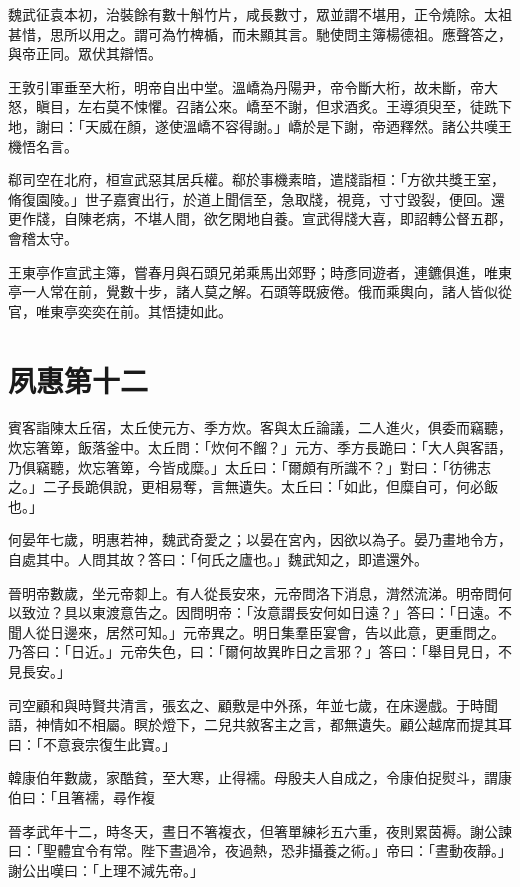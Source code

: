 魏武征袁本初，治裝餘有數十斛竹片，咸長數寸，眾並謂不堪用，正令燒除。太祖甚惜，思所以用之。謂可為竹椑楯，而未顯其言。馳使問主簿楊德祖。應聲答之，與帝正同。眾伏其辯悟。

王敦引軍垂至大桁，明帝自出中堂。溫嶠為丹陽尹，帝令斷大桁，故未斷，帝大怒，瞋目，左右莫不悚懼。召諸公來。嶠至不謝，但求酒炙。王導須臾至，徒跣下地，謝曰：「天威在顏，遂使溫嶠不容得謝。」嶠於是下謝，帝迺釋然。諸公共嘆王機悟名言。

郗司空在北府，桓宣武惡其居兵權。郗於事機素暗，遣牋詣桓：「方欲共獎王室，脩復園陵。」世子嘉賓出行，於道上聞信至，急取牋，視竟，寸寸毀裂，便回。還更作牋，自陳老病，不堪人間，欲乞閑地自養。宣武得牋大喜，即詔轉公督五郡，會稽太守。

王東亭作宣武主簿，嘗春月與石頭兄弟乘馬出郊野；時彥同遊者，連鑣俱進，唯東亭一人常在前，覺數十步，諸人莫之解。石頭等既疲倦。俄而乘輿向，諸人皆似從官，唯東亭奕奕在前。其悟捷如此。



\chapter{夙惠第十二}

賓客詣陳太丘宿，太丘使元方、季方炊。客與太丘論議，二人進火，俱委而竊聽，炊忘箸箄，飯落釜中。太丘問：「炊何不餾？」元方、季方長跪曰：「大人與客語，乃俱竊聽，炊忘箸箄，今皆成糜。」太丘曰：「爾頗有所識不？」對曰：「彷彿志之。」二子長跪俱說，更相易奪，言無遺失。太丘曰：「如此，但糜自可，何必飯也。」

何晏年七歲，明惠若神，魏武奇愛之；以晏在宮內，因欲以為子。晏乃畫地令方，自處其中。人問其故？答曰：「何氏之廬也。」魏武知之，即遣還外。

晉明帝數歲，坐元帝厀上。有人從長安來，元帝問洛下消息，潸然流涕。明帝問何以致泣？具以東渡意告之。因問明帝：「汝意謂長安何如日遠？」答曰：「日遠。不聞人從日邊來，居然可知。」元帝異之。明日集羣臣宴會，告以此意，更重問之。乃答曰：「日近。」元帝失色，曰：「爾何故異昨日之言邪？」答曰：「舉目見日，不見長安。」

司空顧和與時賢共清言，張玄之、顧敷是中外孫，年並七歲，在床邊戲。于時聞語，神情如不相屬。瞑於燈下，二兒共敘客主之言，都無遺失。顧公越席而提其耳曰：「不意衰宗復生此寶。」

韓康伯年數歲，家酷貧，至大寒，止得襦。母殷夫人自成之，令康伯捉熨斗，謂康伯曰：「且箸襦，尋作複

晉孝武年十二，時冬天，晝日不箸複衣，但箸單練衫五六重，夜則累茵褥。謝公諫曰：「聖體宜令有常。陛下晝過冷，夜過熱，恐非攝養之術。」帝曰：「晝動夜靜。」謝公出嘆曰：「上理不減先帝。」

